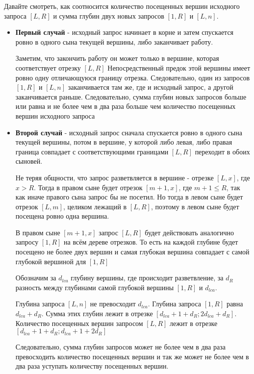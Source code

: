 Давайте смотреть, как соотносится количество посещенных вершин исходного запроса $[L, R]$ и сумма глубин двух новых запросов $[1, R]$ и $[L, n]$.

\begin{itemize}
    \item \textbf{Первый случай} - исходный запрос начинает в корне и затем спускается ровно в одного сына текущей вершины, либо заканчивает работу.
    
    Заметим, что закончить работу он может только в вершине, которая соответствует отрезку $[L, R]$
    Непосредственный предок этой вершины имеет ровно одну отличающуюся границу отрезка. Следовательно,
    один из запросов $[1, R]$ и $[L, n]$ заканчивается там же, где и исходный запрос, а другой заканчивается раньше.
    Следовательно, сумма глубин новых запросов больше или равна и не более чем в два раза больше чем количество
    посещенных вершин исходного запроса
  
  
    \item \textbf{Второй случай} - исходный запрос сначала спускается ровно в одного сына текущей вершины, потом в вершине,
    у которой либо левая, либо правая граница совпадает с соответствующими границами $[L, R]$ переходит в обоих
    сыновей.
    
    Не теряя общности, что запрос разветвляется в вершине - отрезке $[L, x]$, где $x > R$.
    Тогда в правом сыне будет отрезок $[m + 1, x]$, где $m + 1 \le R$, так как иначе правого сына запрос бы
    не посетил. Но тогда в левом сыне будет отрезок $[L, m]$, целиком лежащий в $[L, R]$,
    поэтому в левом сыне будет посещена ровно одна вершина.
    
    В правом сыне $[m + 1, x]$ запрос $[L, R]$ будет действовать аналогично запросу $[1, R]$ на всём
    дереве отрезков. То есть на каждой глубине будет посещено не более двух вершин и самая глубокая вершина совпадает с самой глубокой вершиной для $[1, R]$
    
    Обозначим за $d_{lca}$ глубину вершины, где происходит разветвление, за $d_R$ разность между глубинами самой глубокой вершины $[1, R]$ и $d_{lca}$.
    
    Глубина запроса $[L, n]$ не превосходит $d_{lca}$. Глубина запроса $[1, R]$ равна $d_{lca} + d_R$. 
    Сумма этих глубин лежит в отрезке $[d_{lca} + 1 + d_R; 2d_{lca} + d_R]$. Количество посещенных вершин запросом $[L, R]$ лежит в отрезке $[d_{lca} + 1 + d_R; d_{lca} + 1 + 2d_R]$
    
    Следовательно, сумма глубин запросов может не более чем в два раза превосходить количество посещенных вершин и так же может не более чем в два раза уступать количеству посещенных вершин.
    

\end{itemize}
